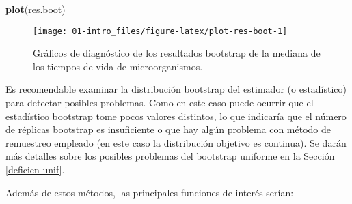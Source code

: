 \documentclass[
]{book}
\newenvironment{Shaded}{\begin{snugshade}}{\end{snugshade}}
\newcommand{\KeywordTok}[1]{\textcolor[rgb]{0.13,0.29,0.53}{\textbf{#1}}}
\newcommand{\NormalTok}[1]{#1}
\theoremstyle{break}
\theoremstyle{definition}
\theoremstyle{definition}
\theoremstyle{definition}
\theoremstyle{remark}
\begin{document}
\begin{Shaded}
\begin{Highlighting}[]
\KeywordTok{plot}\NormalTok{(res.boot)}
\end{Highlighting}
\end{Shaded}

\begin{figure}[!htb]

{\centering \texttt{[image: 01-intro\_files/figure-latex/plot-res-boot-1]} 

}

\caption{Gráficos de diagnóstico de los resultados bootstrap de la mediana de los tiempos de vida de microorganismos.}\label{fig:plot-res-boot}
\end{figure}

Es recomendable examinar la distribución bootstrap del estimador (o estadístico) para detectar posibles problemas.
Como en este caso puede ocurrir que el estadístico bootstrap tome pocos valores distintos, lo que indicaría que el número de réplicas bootstrap es insuficiente o que hay algún problema con método de remuestreo empleado (en este caso la distribución objetivo es continua).
Se darán más detalles sobre los posibles problemas del bootstrap uniforme en la Sección \ref{deficien-unif}.

Además de estos métodos, las principales funciones de interés serían:
\end{document}
